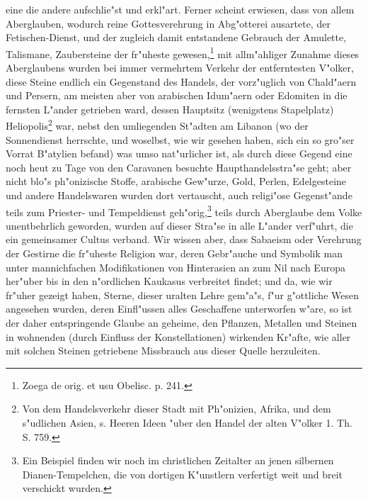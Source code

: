 \documentclass[a4paper, 11pt, oneside, polutonikogreek, german]{article}
\begin{document}
eine die andere aufschlie"st und erkl"art. Ferner scheint erwiesen, dass von allem Aberglauben, wodurch reine Gottesverehrung in Abg"otterei ausartete, der Fetischen-Dienst, und der zugleich damit entstandene Gebrauch der Amulette, Talismane, Zaubersteine der fr"uheste gewesen,\footnote{Zoega de orig. et usu Obelisc. p. 241.} mit allm"ahliger Zunahme dieses Aberglaubens wurden bei immer vermehrtem Verkehr der entferntesten V"olker, diese Steine endlich ein Gegenstand des Handels, der vorz"uglich von Chald"aern und Persern, am meisten aber von arabischen Idum"aern oder Edomiten in die fernsten L"ander getrieben ward, dessen Hauptsitz (wenigstens Stapelplatz) Heliopolis\footnote{Von dem Handelsverkehr dieser Stadt mit Ph"onizien, Afrika, und dem s"udlichen Asien, s. Heeren Ideen "uber den Handel der alten V"olker 1. Th. S. 759.} war, nebst den umliegenden St"adten am Libanon (wo der Sonnendienst herrschte, und woselbst, wie wir gesehen haben, sich ein so gro"ser Vorrat B"atylien befand) was umso nat"urlicher ist, als durch diese Gegend eine noch heut zu Tage von den Caravanen besuchte Haupthandelsstra"se geht; aber nicht blo"s ph"onizische Stoffe, arabische Gew"urze, Gold, Perlen, Edelgesteine und andere Handelswaren wurden dort vertauscht, auch religi"ose Gegenst"ande teils zum Priester- und Tempeldienst geh"orig,\footnote{Ein Beispiel finden wir noch im christlichen Zeitalter an jenen silbernen Dianen-Tempelchen, die von dortigen K"unstlern verfertigt weit und breit verschickt wurden.} teils durch Aberglaube dem Volke unentbehrlich geworden, wurden auf dieser Stra"se in alle L"ander verf"uhrt, die ein gemeinsamer Cultus verband. Wir wissen aber, dass Sabaeism oder Verehrung der Gestirne die fr"uheste Religion war, deren Gebr"auche und Symbolik man unter mannichfachen Modifikationen von Hinterasien an zum Nil nach Europa her"uber bis in den n"ordlichen Kaukasus verbreitet findet; und da, wie wir fr"uher gezeigt haben, Sterne, dieser uralten Lehre gem"a"s, f"ur g"ottliche Wesen angesehen wurden, deren Einfl"ussen alles Geschaffene unterworfen w"are, so ist der daher entspringende Glaube an geheime, den Pflanzen, Metallen und Steinen in wohnenden (durch Einfluss der Konstellationen) wirkenden Kr"afte, wie aller mit solchen Steinen getriebene Missbrauch aus dieser Quelle herzuleiten.
\end{document}
